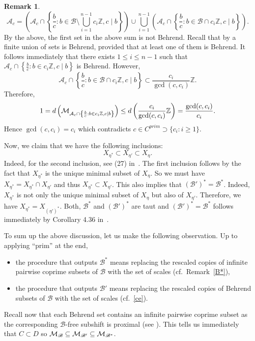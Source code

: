 \documentclass[leqno,a4paper,12pt]{article}
\theoremstyle{definition}
\newtheorem{Remark}[Th]{Remark}
\newcommand{\cM}{{\cal M}}
\newcommand{\Z}{{\mathbb{Z}}}
\newcommand{\cA}{\mathcal{A}}
\newcommand{\sB}{\mathscr{B}}
\begin{document}
\begin{Remark}
\[
\cA_c=\left(\cA_c\cap\left\{\frac{b}{c}: b\in\sB\setminus\bigcup_{i=1}^{n-1}c_i\Z, c\mid b\right\}\right)\cup \bigcup_{i=1}^{n-1} \left(\cA_c\cap\left\{\frac{b}{c}:b\in \sB\cap c_i\Z,c\mid b\right\}\right).
\]
By the above, the first set in the above sum is not Behrend. Recall that by \cite[Corollary 0.14]{MR1414678} a finite union of sets is Behrend, provided that at least one of them is Behrend. It follows immediately that there exists $1\leq i\leq n-1$ such that $\cA_c\cap\left\{\frac{b}{c}:b\in c_i\Z,c\mid b\right\}$ is Behrend. However,
\[
\cA_c\cap\left\{\frac{b}{c}:b\in \sB\cap c_i\Z,c\mid b\right\}\subset\frac{c_i}{\gcd(c,c_i)}\Z.
\]
Therefore,
\[
1=d\left(\cM_{\cA_c\cap\left\{\frac{b}{c}:b\in c_i\Z,c\mid b\right\}}\right)\leq d\left(\frac{c_i}{\gcd(c,c_i)}\Z\right)=\frac{\gcd(c,c_i)}{c_i}.\] Hence $\gcd(c,c_i) =c_i$ which contradicts $c\in C^{prim}\supset\{c_i:i\geq1\}$.

Now, we claim that we have the following inclusions:
\[
X_{\eta^*}\subset X_{\eta'}\subset X_\eta.
\]
Indeed, for the second inclusion, see (27) in~\cite{MR4289651}. The first inclusion follows by the fact that $X_{\eta^*}$ is the unique minimal subset of $X_\eta$. So we must have $X_{\eta^*}=X_{\eta^*}\cap X_{\eta'}$ and thus $X_{\eta^*}\subset X_{\eta'}$. This also implies that $(\sB')^*=\sB^*$. Indeed, $X_{\eta^*}$ is not only the unique minimal subset of $X_\eta$ but also of $X_{\eta'}$. Therefore, we have $X_{\eta^*}=X_{(\eta')^*}$. Both, $\sB^*$ and $(\sB')^*$ are taut and $(\sB')^*=\sB^*$ follows immediately by Corollary 4.36 in~\cite{MR3803141}.

To sum up the above discussion, let us make the following observation. Up to applying ``prim'' at the end,
\begin{itemize}
\item
the procedure that outputs $\sB^*$ means replacing the rescaled copies of infinite pairwise coprime subsets of $\sB$ with the set of scales (cf.\ Remark~\ref{B*}),
\item
the procedure that outputs $\sB'$ means replacing the rescaled copies of Behrend subsets of $\sB$ with the set of scales (cf.\ \eqref{ce}).
\end{itemize}
Recall now that each Behrend set contains an infinite pairwise coprime subset as the corresponding $\sB$-free subshift is proximal (see \cite[Theorem 3.7]{MR3803141}). This tells us immediately that
$C\subset D$ so $\cM_\sB\subseteq\cM_{\sB'}\subseteq\cM_{\sB^*}$.%
\end{Remark}
\end{document}
